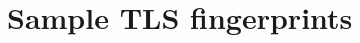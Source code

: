 \documentclass{sig-alternate}
\begin{document}







\appendix

\section{Sample TLS fingerprints}
\label{sec:ciphersuites}
\end{document}
